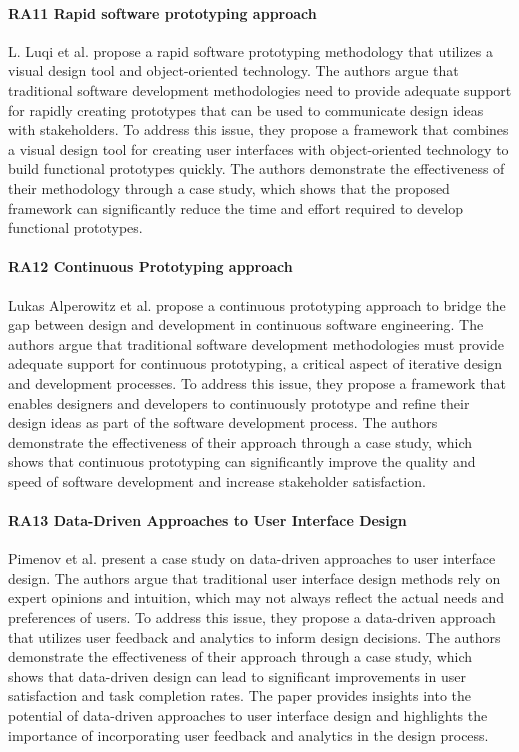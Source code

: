 \paragraph{RA11 Rapid software prototyping approach}
L. Luqi et al. \cite{paper:prototyping:luqi} propose a rapid software prototyping methodology that utilizes a visual design tool and object-oriented technology. 
The authors argue that traditional software development methodologies need to provide adequate support for rapidly creating prototypes that can be used to communicate design ideas with stakeholders. 
To address this issue, they propose a framework that combines a visual design tool for creating user interfaces with object-oriented technology to build functional prototypes quickly. 
The authors demonstrate the effectiveness of their methodology through a case study, which shows that the proposed framework can significantly reduce the time and effort required to develop functional prototypes.

\paragraph{RA12 Continuous Prototyping approach}
Lukas Alperowitz et al. \cite{misc:prototyping:lukas} propose a continuous prototyping approach to bridge the gap between design and development in continuous software engineering. 
The authors argue that traditional software development methodologies must provide adequate support for continuous prototyping, a critical aspect of iterative design and development processes. 
To address this issue, they propose a framework that enables designers and developers to continuously prototype and refine their design ideas as part of the software development process. 
The authors demonstrate the effectiveness of their approach through a case study, which shows that continuous prototyping can significantly improve the quality and speed of software development and increase stakeholder satisfaction.

\paragraph{RA13 Data-Driven Approaches to User Interface Design}
Pimenov et al. \cite{misc:data-driven:pimenov} present a case study on data-driven approaches to user interface design. 
The authors argue that traditional user interface design methods rely on expert opinions and intuition, which may not always reflect the actual needs and preferences of users. 
To address this issue, they propose a data-driven approach that utilizes user feedback and analytics to inform design decisions. 
The authors demonstrate the effectiveness of their approach through a case study, which shows that data-driven design can lead to significant improvements in user satisfaction and task completion rates. 
The paper provides insights into the potential of data-driven approaches to user interface design and highlights the importance of incorporating user feedback and analytics in the design process.

